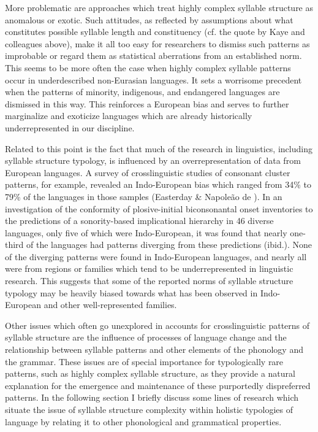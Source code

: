   More problematic are approaches which treat highly complex syllable structure as anomalous or exotic. Such attitudes, as reflected by assumptions about what constitutes possible syllable length and constituency (cf. the quote by Kaye and colleagues above), make it all too easy for researchers to dismiss such patterns as improbable or regard them as statistical aberrations from an established norm. This seems to be more often the case when highly complex syllable patterns occur in underdescribed non-Eurasian languages. It sets a worrisome precedent when the patterns of minority, indigenous, and endangered languages are dismissed in this way. This reinforces a European bias and serves to further marginalize and exoticize languages which are already historically underrepresented in our discipline.



  Related to this point is the fact that much of the research in linguistics, including syllable structure typology, is influenced by an overrepresentation of data from European languages. A survey of crosslinguistic studies of consonant cluster patterns, for example, revealed an Indo-European bias which ranged from 34\% \citep{Morelli1999} to 79\% \citep{Vennemann2012} of the languages in those samples (Easterday \& Napoleão de \citealt{Souza2015}). In an investigation of the conformity of plosive-initial biconsonantal onset inventories to the predictions of a sonority-based implicational hierarchy in 46 diverse languages, only five of which were Indo-European, it was found that nearly one-third of the languages had patterns diverging from these predictions (ibid.). None of the diverging patterns were found in Indo-European languages, and nearly all were from regions or families which tend to be underrepresented in linguistic research. This suggests that some of the reported norms of syllable structure typology may be heavily biased towards what has been observed in Indo-European and other well-represented families.



  Other issues which often go unexplored in accounts for crosslinguistic patterns of syllable structure are the influence of processes of language change and the relationship between syllable patterns and other elements of the phonology and the grammar. These issues are of special importance for typologically rare patterns, such as highly complex syllable structure, as they provide a natural explanation for the emergence and maintenance of these purportedly dispreferred patterns. In the following section I briefly discuss some lines of research which situate the issue of syllable structure complexity within holistic typologies of language by relating it to other phonological and grammatical properties.



